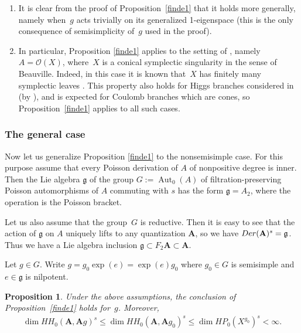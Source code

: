 \documentclass[11pt]{article}
\numberwithin{equation}{section}
\numberwithin{equation}{section}
\newtheorem{Proposition}[Theorem]{Proposition}
\newcommand{\g}{\mathfrak{g}}
\begin{document}
\begin{Remark} \quad
\begin{enumerate}\itemsep=0pt
\item It is clear from the proof of Proposition~\ref{finde1} that it holds more generally, namely when~$g$ acts trivially on its generalized 1-eigenspace (this is the only consequence of semisimplicity of~$g$ used in the proof).
\item In particular, Proposition \ref{finde1} applies to the setting of \cite{L2}, namely $A=\mathcal{O}(X)$, where~$X$ is a conical symplectic singularity in the sense of Beauville. Indeed, in this case it is known that~$X$ has finitely many symplectic leaves \cite[Theorem~2.3]{Ka}. This property also holds for Higgs branches considered in~\cite{BPR} (by \cite[Section~2.3]{L3}), and is expected for Coulomb branches which are cones, so Proposition~\ref{finde1} applies to all such cases.
\end{enumerate}
\end{Remark}

\setcounter{Theorem}{13}
\subsubsection{The general case}
Now let us generalize Proposition \ref{finde1} to the nonsemisimple case. For this purpose assume that every Poisson derivation of $A$ of nonpositive degree is inner. Then the Lie algebra $\g$ of the group
$G:=\operatorname{Aut}_0(A)$ of filtration-preserving Poisson automorphisms of $A$ commuting with $s$ has the form $\g=A_2$, where the operation is the Poisson bracket.

Let us also assume that the group~$G$ is reductive. Then it is easy to see that the action of $\g$ on $A$ uniquely lifts to any quantization ${\mathbf A}$, so we have ${\rm Der}({\mathbf A})^s=\g$. Thus we have a Lie algebra inclusion $\g\subset F_2{\mathbf A}\subset {\mathbf A}$.

Let $g\in G$. Write $g=g_0\exp(e)=\exp(e)g_0$ where $g_0\in G$ is semisimple and $e\in \g$ is nilpotent.

\begin{Proposition}\label{finde2} Under the above assumptions, the conclusion of Proposition~{\rm \ref{finde1}} holds for~$g$. Moreover,
\begin{gather*}
\dim HH_0({\mathbf A},{\mathbf A}g)^s\le \dim HH_0({\mathbf A},{\mathbf A}g_0)^s\le \dim HP_0(X^{g_0})^s<\infty.
\end{gather*}
\end{Proposition}
\end{document}
